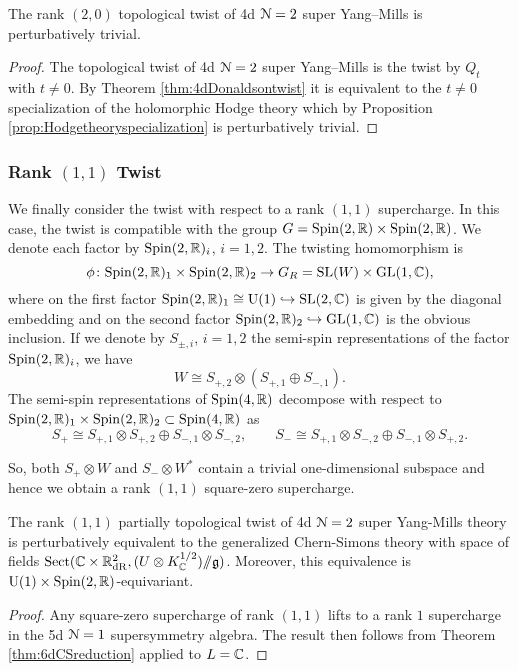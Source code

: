 \documentclass[10pt, oneside]{article}
\renewcommand{\U}{\mathrm{U}}
\newcommand{\ham}{/\!\!/}
\begin{document}
\begin{corollary}
The rank $(2,0)$ topological twist of 4d $\mathcal N=2$ super Yang--Mills is perturbatively trivial.
\label{cor:4dDonaldsontwist}
\end{corollary}
\begin{proof}
The topological twist of 4d $\mathcal N=2$ super Yang--Mills is the twist by $Q_t$ with $t\neq 0$. By Theorem \ref{thm:4dDonaldsontwist} it is equivalent to the $t\neq 0$ specialization of the holomorphic Hodge theory which by Proposition \ref{prop:Hodgetheoryspecialization} is perturbatively trivial.
\end{proof}

\subsubsection{Rank \texorpdfstring{$(1,1)$}{(1,1)} Twist}
\label{sect:4d_2_11}

We finally consider the twist with respect to a rank $(1,1)$ supercharge.
In this case, the twist is compatible with the group $G = \mathrm{Spin}(2, \mathbb R) \times \mathrm{Spin}(2, \mathbb R)$. 
We denote each factor by $\mathrm{Spin}(2, \mathbb R)_i$, $i=1,2$.  
The twisting homomorphism is
\[
\phi \colon \mathrm{Spin}(2, \mathbb R)_1 \times \mathrm{Spin}(2, \mathbb R)_2 \to G_R=\mathrm{SL}(W)\times \mathrm{GL}(1, \mathbb C),
\]
where on the first factor $\Spin(2, \RR)_1 \cong \U(1)\hookrightarrow \SL(2, \CC)$ is given by the diagonal embedding and on the second factor $\mathrm{Spin}(2, \mathbb R)_2 \hookrightarrow \mathrm{GL}(1, \mathbb C)$ is the obvious inclusion. 
If we denote by $S_{\pm, i}$, $i=1,2$ the semi-spin representations of the factor $\mathrm{Spin}(2, \mathbb R)_i$, we have
\[W \cong S_{+,2}\otimes (S_{+,1}\oplus S_{-,1}).\]
The semi-spin representations of $\mathrm{Spin}(4, \mathbb R)$ decompose with respect to $\mathrm{Spin}(2, \mathbb R)_1 \times \mathrm{Spin}(2, \mathbb R)_2\subset \mathrm{Spin}(4, \mathbb R)$ as
\[S_+\cong S_{+,1} \otimes S_{+,2} \oplus S_{-,1} \otimes S_{-,2},\qquad S_-\cong S_{+,1} \otimes S_{-,2} \oplus S_{-,1} \otimes S_{+,2}.\]

So, both $S_+\otimes W$ and $S_-\otimes W^*$ contain a trivial one-dimensional subspace and hence we obtain a rank $(1, 1)$ square-zero supercharge.

\begin{theorem} \label{thm:4d_11_twist}
The rank $(1,1)$ partially topological twist of 4d $\mathcal{N}=2$ super Yang-Mills theory is perturbatively equivalent to the generalized Chern-Simons theory with space of fields $\mr{Sect}(\CC \times \RR^2_{\mr{dR}}, (U \otimes K_\CC^{1/2}) \ham \gg)$.  
Moreover, this equivalence is $\U(1) \times \Spin(2, \RR)$-equivariant.
\end{theorem}
\begin{proof}
Any square-zero supercharge of rank $(1, 1)$ lifts to a rank $1$ supercharge in the 5d $\mathcal N=1$ supersymmetry algebra.
The result then follows from Theorem \ref{thm:6dCSreduction} applied to $L = \mathbb C$. 
\end{proof}
\end{document}
